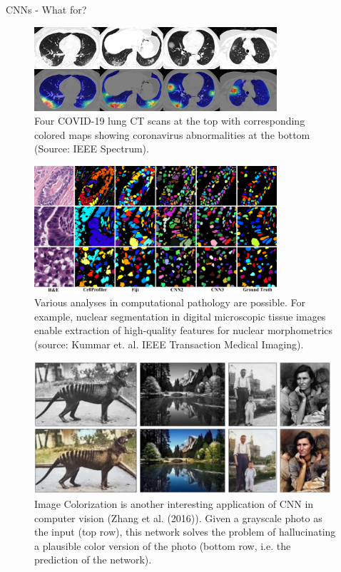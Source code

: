 \begin{vbframe}{CNNs - What for?}
   \begin{figure}
    \centering
    \includegraphics[width=9cm]{figure/hitmap.jpeg}
    \caption{Four COVID-19 lung CT scans at the top with corresponding colored maps showing coronavirus abnormalities at the bottom (Source: IEEE Spectrum).}
  \end{figure}
\framebreak

  \begin{figure}
    \centering
    \includegraphics[width=9cm]{figure/instanceseg.png}
    \caption{Various analyses in computational pathology are possible. For example, nuclear segmentation in digital microscopic tissue images enable extraction of high-quality features for nuclear morphometrics (source: Kummar et. al. IEEE Transaction Medical Imaging). }
  \end{figure}
\framebreak

  \begin{figure}
    \centering
    \includegraphics[width=11cm]{figure/colorization.png}
    \caption{Image Colorization is another interesting application of CNN in computer vision (Zhang et al. (2016)). Given a grayscale photo as the input (top row), this network solves the problem of hallucinating a plausible color version of the photo (bottom row, i.e. the prediction of the network).}
  \end{figure}
\framebreak


\end{vbframe}
